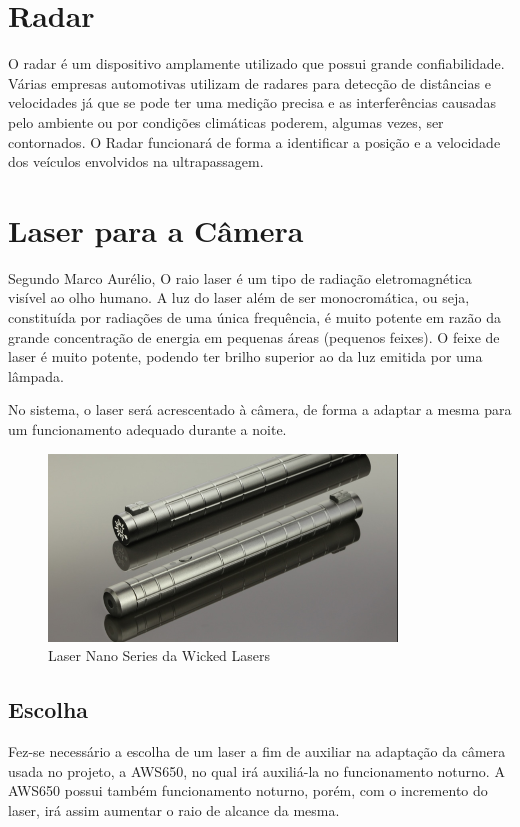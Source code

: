 \section{Radar}

O radar é um dispositivo amplamente utilizado que possui grande confiabilidade. Várias empresas automotivas utilizam de radares para detecção de distâncias e velocidades já que se pode ter uma medição precisa e as interferências causadas pelo ambiente ou por condições climáticas poderem, algumas vezes, ser contornados. O Radar funcionará de forma a identificar a posição e a velocidade dos veículos envolvidos na ultrapassagem.

\section{Laser para a Câmera}

Segundo Marco Aurélio, O raio laser é um tipo de radiação eletromagnética visível ao olho humano. A luz do laser além de ser monocromática, ou seja, constituída por radiações de uma única frequência, é muito potente em razão da grande concentração de energia em pequenas áreas (pequenos feixes). O feixe de laser é muito potente, podendo ter brilho superior ao da luz emitida por uma lâmpada.

No sistema, o laser será acrescentado à câmera, de forma a adaptar a mesma para um funcionamento adequado durante a noite.

\begin{figure}[h]
  \centering
  \includegraphics[width=350px, scale=1]{figuras/laser_nano}
  \caption{Laser Nano Series da Wicked Lasers}
\label{fig:laser_nano}
\end{figure}

\subsection{Escolha}

Fez-se necessário a escolha de um laser a fim de auxiliar na adaptação da câmera usada no projeto, a AWS650, no qual irá auxiliá-la no funcionamento noturno. A AWS650 possui também funcionamento noturno, porém, com o incremento do laser, irá assim aumentar o raio de alcance da mesma. 

